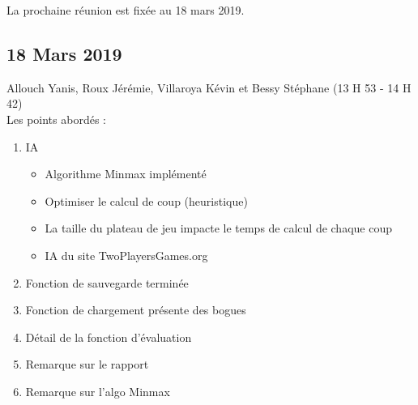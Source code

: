 \documentclass[11pt,a4paper]{article}
\begin{document}
    La prochaine réunion est fixée au 18 mars 2019.

\newpage
\subsection{18 Mars 2019}
Allouch Yanis, Roux Jérémie, Villaroya Kévin et Bessy Stéphane (13 H 53 - 14 H 42)\\

Les points abordés :
\begin{enumerate}
    \item IA 
    \begin{itemize}
        \item Algorithme Minmax implémenté
        \item Optimiser le calcul de coup (heuristique)
        \item La taille du plateau de jeu impacte le temps de calcul de chaque coup
        \item IA du site TwoPlayersGames.org
    \end{itemize}
    \item Fonction de sauvegarde terminée
    \item Fonction de chargement présente des bogues
    \item Détail de la fonction d'évaluation
    \item Remarque sur le rapport
    \item Remarque sur l'algo Minmax
    \label{entrevue:18mars}
\end{enumerate}

\begin{tabular}{c}
    \hline
\end{tabular}\\
\end{document}
